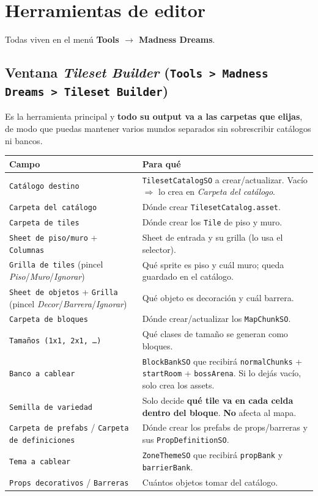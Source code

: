 \documentclass[11pt,a4paper]{article}
\newcommand{\code}[1]{\texttt{#1}}
\begin{document}
\section{Herramientas de editor}

Todas viven en el menú \textbf{Tools $\rightarrow$ Madness Dreams}.

\subsection{Ventana \emph{Tileset Builder} (\code{Tools > Madness Dreams > Tileset Builder})}

Es la herramienta principal y \textbf{todo su output va a las carpetas que elijas}, de modo que puedas
mantener varios mundos separados sin sobrescribir catálogos ni bancos.

\begin{longtable}{@{}p{5.2cm}p{9.2cm}@{}}
\toprule
\textbf{Campo} & \textbf{Para qué} \\
\midrule
\endhead
\code{Catálogo destino} & \code{TilesetCatalogSO} a crear/actualizar. Vacío $\Rightarrow$ lo crea en \emph{Carpeta del catálogo}. \\
\code{Carpeta del catálogo} & Dónde crear \code{TilesetCatalog.asset}. \\
\code{Carpeta de tiles} & Dónde crear los \code{Tile} de piso y muro. \\
\code{Sheet de piso/muro} + \code{Columnas} & Sheet de entrada y su grilla (lo usa el selector). \\
\code{Grilla de tiles} (pincel \emph{Piso}/\emph{Muro}/\emph{Ignorar}) & Qué sprite es piso y cuál muro; queda guardado en el catálogo. \\
\code{Sheet de objetos} + \code{Grilla} (pincel \emph{Decor}/\emph{Barrera}/\emph{Ignorar}) & Qué objeto es decoración y cuál barrera. \\
\code{Carpeta de bloques} & Dónde crear/actualizar los \code{MapChunkSO}. \\
\code{Tamaños (1x1, 2x1, \ldots)} & Qué clases de tamaño se generan como bloques. \\
\code{Banco a cablear} & \code{BlockBankSO} que recibirá \code{normalChunks} + \code{startRoom} + \code{bossArena}. Si lo dejás vacío, solo crea los assets. \\
\code{Semilla de variedad} & Solo decide \textbf{qué tile va en cada celda dentro del bloque}. \textbf{No} afecta al mapa. \\
\code{Carpeta de prefabs} / \code{Carpeta de definiciones} & Dónde crear los prefabs de props/barreras y sus \code{PropDefinitionSO}. \\
\code{Tema a cablear} & \code{ZoneThemeSO} que recibirá \code{propBank} y \code{barrierBank}. \\
\code{Props decorativos} / \code{Barreras} & Cuántos objetos tomar del catálogo. \\
\bottomrule
\end{longtable}
\end{document}
